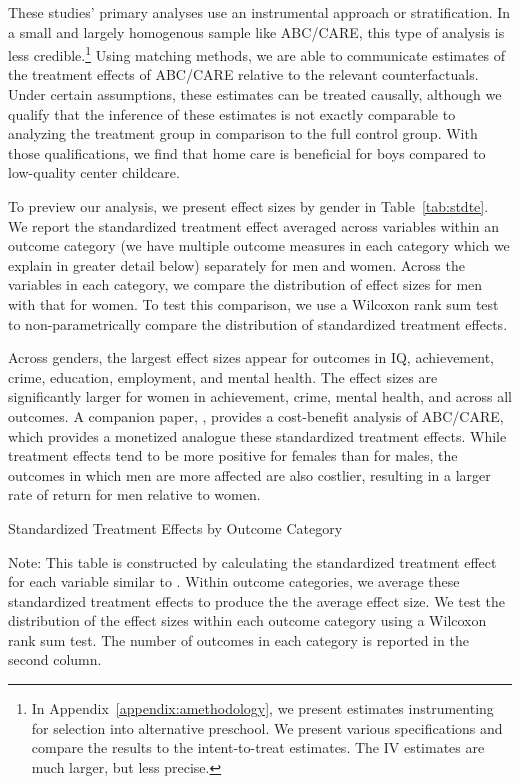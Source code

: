 These studies' primary analyses use an instrumental approach or stratification. In a small and largely homogenous sample like ABC/CARE, this type of analysis is less credible.\footnote{In Appendix~\ref{appendix:amethodology}, we present estimates instrumenting for selection into alternative preschool. We present various specifications and compare the results to the intent-to-treat estimates. The IV estimates are much larger, but less precise.} Using matching methods, we are able to communicate estimates of the treatment effects of ABC/CARE relative to the relevant counterfactuals. Under certain assumptions, these estimates can be treated causally, although we qualify that the inference of these estimates is not exactly comparable to analyzing the treatment group in comparison to the full control group. With those qualifications, we find that home care is beneficial for boys compared to low-quality center childcare. 

To preview our analysis, we present effect sizes by gender in Table~\ref{tab:stdte}. We report the standardized treatment effect averaged across variables within an outcome category (we have multiple outcome measures in each category which we explain in greater detail below) separately for men and women. Across the variables in each category, we compare the distribution of effect sizes for men with that for women. To test this comparison, we use a Wilcoxon rank sum test to non-parametrically compare the distribution of standardized treatment effects.

Across genders, the largest effect sizes appear for outcomes in IQ, achievement, crime, education, employment, and mental health. The effect sizes are significantly larger for women in achievement, crime, mental health, and across all outcomes. A companion paper, \citet{Garcia_Heckman_Leaf_etal_2017_Comp_CBA_Unpublished}, provides a cost-benefit analysis of ABC/CARE, which provides a monetized analogue these standardized treatment effects. While treatment effects tend to be more positive for females than for males, the outcomes in which men are more affected are also costlier, resulting in a larger rate of return for men relative to women.

\begin{table}[H]
\centering
\caption{Standardized Treatment Effects by Outcome Category}
\label{tab:stdte}
\begin{threeparttable}

\begin{tablenotes}
\footnotesize
\item Note: This table is constructed by calculating the standardized treatment effect for each variable similar to \citet{Katz_Kling_etal_2001_QJE}. Within outcome categories, we average these standardized treatment effects to produce the the average effect size. We test the distribution of the effect sizes within each outcome category using a Wilcoxon rank sum test. The number of outcomes in each category is reported in the second column. 
\end{tablenotes}
\end{threeparttable}
\end{table}

